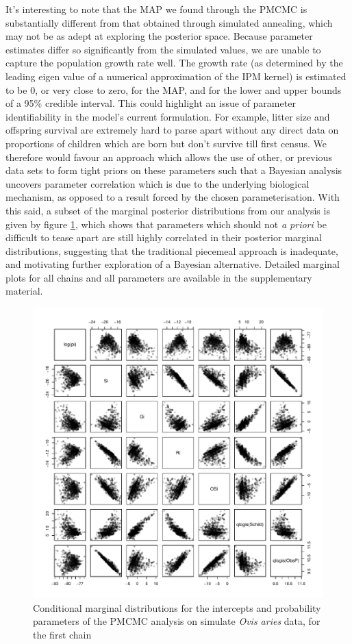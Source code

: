 \documentclass[a4paper,12pt]{article}
\begin{document}
It's interesting to note that the MAP we found through the PMCMC is substantially different from that obtained through simulated annealing, which may not be as adept at exploring the posterior space. Because parameter estimates differ so significantly from the simulated values, we are unable to capture the population growth rate well. The growth rate (as determined by the leading eigen value of a numerical approximation of the IPM kernel) is estimated to be 0, or very close to zero, for the MAP, and for the lower and upper bounds of a 95\% credible interval. This could highlight an issue of parameter identifiability in the model's current formulation. For example, litter size and offspring survival are extremely hard to parse apart without any direct data on proportions of children which are born but don't survive till first census. We therefore would favour an approach which allows the use of other, or previous data sets to form tight priors on these parameters such that a Bayesian analysis uncovers parameter correlation which is due to the underlying biological mechanism, as opposed to a result forced by the chosen parameterisation. With this said, a subset of the marginal posterior distributions from our analysis is given by figure \ref{partialMarg}, which shows that parameters which should not \textit{a priori} be difficult to tease apart are still highly correlated in their posterior marginal distributions, suggesting that the traditional piecemeal approach is inadequate, and motivating further exploration of a Bayesian alternative. Detailed marginal plots for all chains and all parameters are available in the supplementary material.

\begin{figure}[H]
\centering
\includegraphics[scale=0.77]{chain1partialMarg.PDF}
\caption{\label{partialMarg}Conditional marginal distributions for the intercepts and probability parameters of the PMCMC analysis on simulate \textit{Ovis aries} data, for the first chain}
\end{figure}
\end{document}

